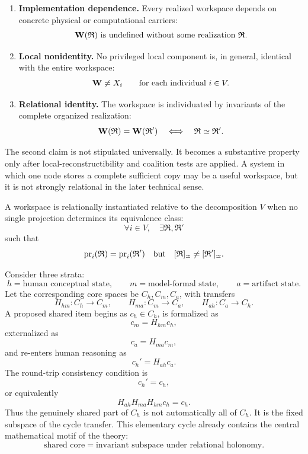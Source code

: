 \begin{enumerate}
\item \textbf{Implementation dependence.}
Every realized workspace depends on concrete physical or computational
carriers:
\[
\mathbf W(\mathfrak R)
\text{ is undefined without some realization }\mathfrak R.
\]

\item \textbf{Local nonidentity.}
No privileged local component is, in general, identical with the entire
workspace:
\[
\mathbf W\neq X_i
\qquad\text{for each individual }i\in V.
\]

\item \textbf{Relational identity.}
The workspace is individuated by invariants of the complete organized
realization:
\[
\mathbf W(\mathfrak R)=\mathbf W(\mathfrak R')
\quad\Longleftrightarrow\quad
\mathfrak R\simeq\mathfrak R'.
\]
\end{enumerate}

The second claim is not stipulated universally. It becomes a substantive
property only after local-reconstructibility and coalition tests are applied.
A system in which one node stores a complete sufficient copy may be a useful
workspace, but it is not strongly relational in the later technical sense.

\begin{definition}\label{def:relational-instantiation}
A workspace is relationally instantiated relative to the decomposition
\(V\) when no single projection determines its equivalence class:
\[
\forall i\in V,\quad
\exists\mathfrak R,\mathfrak R'
\]
such that
\[
\operatorname{pr}_i(\mathfrak R)=\operatorname{pr}_i(\mathfrak R')
\quad\text{but}\quad
[\mathfrak R]_{\simeq}\neq[\mathfrak R']_{\simeq}.
\]
\end{definition}


Consider three strata:
\[
h=\text{human conceptual state},\qquad
m=\text{model-formal state},\qquad
a=\text{artifact state}.
\]
Let the corresponding core spaces be \(C_h,C_m,C_a\), with transfers
\[
H_{hm}:C_h\to C_m,
\qquad
H_{ma}:C_m\to C_a,
\qquad
H_{ah}:C_a\to C_h.
\]
A proposed shared item begins as \(c_h\in C_h\), is formalized as
\[
c_m=H_{hm}c_h,
\]
externalized as
\[
c_a=H_{ma}c_m,
\]
and re-enters human reasoning as
\[
c_h'=H_{ah}c_a.
\]
The round-trip consistency condition is
\[
c_h'=c_h,
\]
or equivalently
\[
\boxed{
H_{ah}H_{ma}H_{hm}c_h=c_h.
}
\]
Thus the genuinely shared part of \(C_h\) is not automatically all of
\(C_h\). It is the fixed subspace of the cycle transfer. This elementary
cycle already contains the central mathematical motif of the theory:
\[
\text{shared core}=\text{invariant subspace under relational holonomy}.
\]

